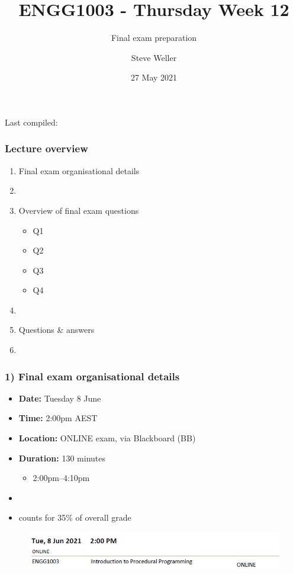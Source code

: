 \documentclass[english,14pt]{beamer}
\title{ENGG1003 - Thursday Week 12}
\subtitle{Final exam preparation}
\author{Steve Weller}
\institute{University of Newcastle}
\date{27 May 2021}
\begin{document}
\begin{flushleft}
{\scriptsize Last compiled:~\DTMnow}
\vspace*{-5mm}
\end{flushleft}
\framebreak


\begin{frame}[fragile]

\frametitle{Lecture overview}
\begin{enumerate}
	\item Final exam organisational details

	\item[]
	
	\item Overview of final exam questions
	\begin{itemize}
		\item Q1
		\item Q2
		\item Q3
		\item Q4
	\end{itemize}

	\item[]

	\item Questions \& answers

	\item[]

\end{enumerate}

\end{frame}


\begin{frame}[fragile]

\frametitle{1) Final exam organisational details}

\begin{itemize}
	\item \textbf{Date:} Tuesday 8 June
	\item \textbf{Time:} 2:00pm AEST
	\item \textbf{Location:} ONLINE exam, via Blackboard (BB)
	\item \textbf{Duration:} 130 minutes
	\begin{itemize}
		\item 2:00pm--4:10pm
	\end{itemize}
	\item[]
	\item counts for 35\% of overall grade
\end{itemize}

\begin{figure}[ht]
	\centering
	\includegraphics[width=\textwidth]{figures/finalexamdatetime}
\end{figure}

\end{frame}
\end{document}
